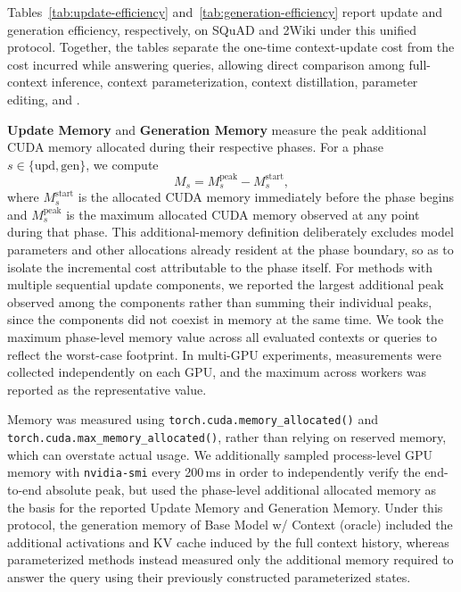 Tables~\ref{tab:update-efficiency} and~\ref{tab:generation-efficiency} report update and generation efficiency, respectively, on SQuAD and 2Wiki under this unified protocol. Together, the tables separate the one-time context-update cost from the cost incurred while answering queries, allowing direct comparison among full-context inference, context parameterization, context distillation, parameter editing, and \method{}.

\textbf{Update Memory} and \textbf{Generation Memory} measure the peak additional CUDA memory allocated during their respective phases. For a phase $s\in\{\mathrm{upd},\mathrm{gen}\}$, we compute
\begin{equation}
M_s
=
M^{\mathrm{peak}}_s-M^{\mathrm{start}}_s,
\label{eq:phase-memory}
\end{equation}
where $M^{\mathrm{start}}_s$ is the allocated CUDA memory immediately before the phase begins and $M^{\mathrm{peak}}_s$ is the maximum allocated CUDA memory observed at any point during that phase. This additional-memory definition deliberately excludes model parameters and other allocations already resident at the phase boundary, so as to isolate the incremental cost attributable to the phase itself. For methods with multiple sequential update components, we reported the largest additional peak observed among the components rather than summing their individual peaks, since the components did not coexist in memory at the same time. We took the maximum phase-level memory value across all evaluated contexts or queries to reflect the worst-case footprint. In multi-GPU experiments, measurements were collected independently on each GPU, and the maximum across workers was reported as the representative value.

Memory was measured using \texttt{torch.cuda.memory\_allocated()} and \texttt{torch.cuda.max\_memory\_allocated()}, rather than relying on reserved memory, which can overstate actual usage. We additionally sampled process-level GPU memory with \texttt{nvidia-smi} every 200\,ms in order to independently verify the end-to-end absolute peak, but used the phase-level additional allocated memory as the basis for the reported Update Memory and Generation Memory. Under this protocol, the generation memory of Base Model w/ Context (oracle) included the additional activations and KV cache induced by the full context history, whereas parameterized methods instead measured only the additional memory required to answer the query using their previously constructed parameterized states.


